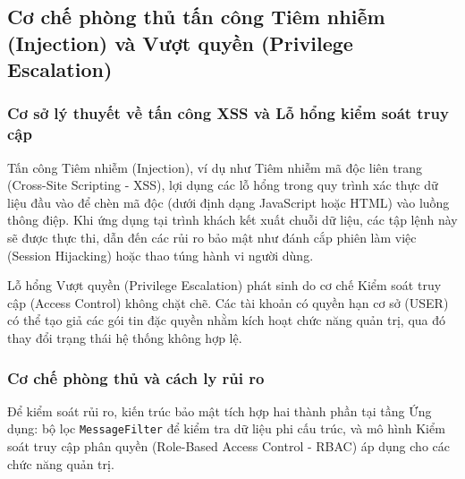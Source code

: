 \subsection[Phòng thủ trước tấn công Tiêm nhiễm và Vượt quyền]{Cơ chế phòng thủ tấn công Tiêm nhiễm (Injection) và Vượt quyền (Privilege Escalation)}

\subsubsection[Cơ sở lý thuyết về tấn công XSS và Lỗ hổng kiểm soát]{Cơ sở lý thuyết về tấn công XSS và Lỗ hổng kiểm soát truy cập}

Tấn công Tiêm nhiễm (Injection), ví dụ như Tiêm nhiễm mã độc liên trang (Cross-Site Scripting - XSS), lợi dụng các lỗ hổng trong quy trình xác thực dữ liệu đầu vào để chèn mã độc (dưới định dạng JavaScript hoặc HTML) vào luồng thông điệp. Khi ứng dụng tại trình khách kết xuất chuỗi dữ liệu, các tập lệnh này sẽ được thực thi, dẫn đến các rủi ro bảo mật như đánh cắp phiên làm việc (Session Hijacking) hoặc thao túng hành vi người dùng.

Lỗ hổng Vượt quyền (Privilege Escalation) phát sinh do cơ chế Kiểm soát truy cập (Access Control) không chặt chẽ. Các tài khoản có quyền hạn cơ sở (USER) có thể tạo giả các gói tin đặc quyền nhằm kích hoạt chức năng quản trị, qua đó thay đổi trạng thái hệ thống không hợp lệ.

\subsubsection{Cơ chế phòng thủ và cách ly rủi ro}

Để kiểm soát rủi ro, kiến trúc bảo mật tích hợp hai thành phần tại tầng Ứng dụng: bộ lọc \texttt{MessageFilter} để kiểm tra dữ liệu phi cấu trúc, và mô hình Kiểm soát truy cập phân quyền (Role-Based Access Control - RBAC) áp dụng cho các chức năng quản trị.

